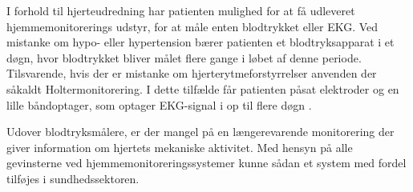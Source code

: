 I forhold til hjerteudredning har patienten mulighed for at få udleveret hjemmemonitorerings udstyr, for at måle enten blodtrykket eller EKG. Ved mistanke om hypo- eller hypertension bærer patienten et blodtryksapparat i et døgn, hvor blodtrykket bliver målet flere gange i løbet af denne periode. Tilsvarende, hvis der er mistanke om hjerterytmeforstyrrelser anvenden der såkaldt Holtermonitorering. I dette tilfælde får patienten påsat elektroder og en lille båndoptager, som optager EKG-signal i op til flere døgn \cite{hjerud}.
 
Udover blodtryksmålere, er der mangel på en længerevarende monitorering der giver information om hjertets mekaniske aktivitet. Med hensyn på alle gevinsterne ved hjemmemonitoreringssystemer kunne sådan et system med fordel tilføjes i sundhedssektoren.